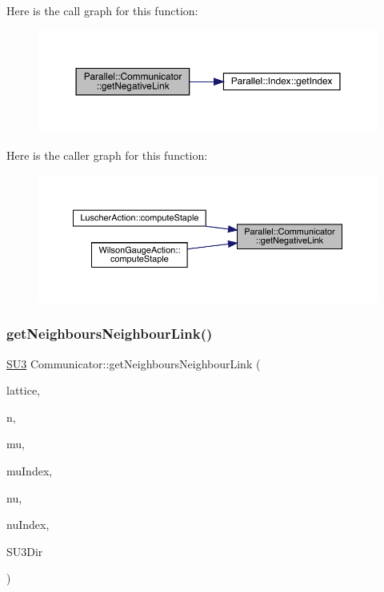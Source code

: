 Here is the call graph for this function\+:
\nopagebreak
\begin{figure}[H]
\begin{center}
\leavevmode
\includegraphics[width=350pt]{class_parallel_1_1_communicator_ae843d16f4aed13d5b5179a05b717ec88_cgraph}
\end{center}
\end{figure}
Here is the caller graph for this function\+:
\nopagebreak
\begin{figure}[H]
\begin{center}
\leavevmode
\includegraphics[width=350pt]{class_parallel_1_1_communicator_ae843d16f4aed13d5b5179a05b717ec88_icgraph}
\end{center}
\end{figure}
\mbox{\label{class_parallel_1_1_communicator_a27862560cf6c7b8ccf650a422e014776}} 
\subsubsection{\texorpdfstring{getNeighboursNeighbourLink()}{getNeighboursNeighbourLink()}}
{\footnotesize\ttfamily \mbox{\hyperlink{class_s_u3}{S\+U3}} Communicator\+::get\+Neighbours\+Neighbour\+Link (\begin{DoxyParamCaption}\item[{\mbox{\hyperlink{class_lattice}{Lattice}}$<$ \mbox{\hyperlink{class_s_u3}{S\+U3}} $>$ $\ast$}]{lattice,  }\item[{std\+::vector$<$ int $>$}]{n,  }\item[{int}]{mu,  }\item[{int $\ast$}]{mu\+Index,  }\item[{int}]{nu,  }\item[{int $\ast$}]{nu\+Index,  }\item[{int}]{S\+U3\+Dir }\end{DoxyParamCaption})\hspace{0.3cm}{\ttfamily [static]}}

